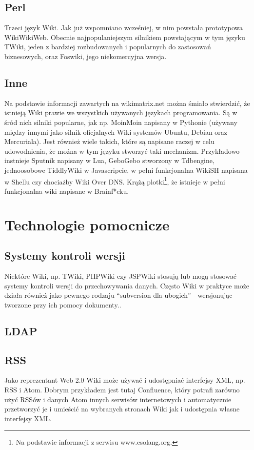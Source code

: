 \documentclass{article}
\begin{document}
	\subsection{Perl}
	Trzeci język Wiki. Jak już wspomniano wcześniej, w nim powstała prototypowa WikiWikiWeb. Obecnie najpopulaniejszym silnikiem powstającym w tym języku TWiki, jeden z bardziej rozbudowanych i popularnych do zastosowań biznesowych, oraz Foswiki, jego niekomercyjna wersja.  
	\subsection{Inne}
	Na podstawie informacji zawartych na wikimatrix.net można śmiało stwierdzić, że istnieją Wiki prawie we wszystkich używanych językach programowania. Są w śród nich silniki popularne, jak np. MoinMoin napisany w Pythonie (używany między innymi jako silnik oficjalnych Wiki systemów Ubuntu, Debian oraz Mercuriala). Jest również wiele takich, które są napisane raczej w celu udowodnienia, że można w tym języku stworzyć taki mechanizm. Przykładowo instnieje Sputnik napisany w Lua, GeboGebo stworzony w Tdbengine, jednoosobowe TiddlyWiki w Javascripcie, w pełni funkcjonalna WikiSH napisana w Shellu czy chociażby Wiki Over DNS. Krążą plotki\footnote{Na podstawie informacji z serwisu www.esolang.org.}, że istnieje w pełni funkcjonalna wiki napisane w Brainf*cku. 	

\newpage
\section{Technologie pomocnicze}
	\subsection{Systemy kontroli wersji}
	Niektóre Wiki, np. TWiki, PHPWiki czy JSPWiki stosują lub mogą stosować systemy kontroli wersji do przechowywania danych. Często Wiki w praktyce może działa również jako pewnego rodzaju ``subversion dla ubogich'' - wersjonując tworzone przy ich pomocy dokumenty..  
	\subsection{LDAP}
	\subsection{RSS}
	Jako reprezentant Web 2.0 Wiki może używać i udostępniać interfejsy XML, np. RSS i Atom. Dobrym przykładem jest tutaj Confluence, który potrafi zarówno użyć RSSów i danych Atom innych serwisów internetowych i automatycznie przetworzyć je i umieścić na wybranych stronach Wiki jak i udostępnia własne interfejsy XML.  
\newpage
\end{document}
